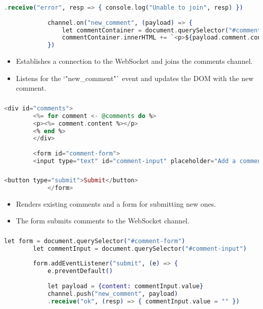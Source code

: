 \documentclass[aspectratio=169, table]{beamer}
\begin{document}
	\begin{frame}[fragile]
		\frametitle{}
		\begin{lstlisting}[language=Elixir]
			.receive("error", resp => { console.log("Unable to join", resp) })
			
			channel.on("new_comment", (payload) => {
				let commentContainer = document.querySelector("#comments")
				commentContainer.innerHTML += `<p>${payload.comment.content}</p>`
			})
		\end{lstlisting}
		\begin{itemize}
			\item Establishes a connection to the WebSocket and joins the comments channel.
			\item Listens for the `"new\_comment"` event and updates the DOM with the new comment.
		\end{itemize}
	\end{frame}
	
	\begin{frame}[fragile]
	\frametitle{}
	\begin{lstlisting}[language=Elixir]
		<div id="comments">
		<%= for comment <- @comments do %>
		<p><%= comment.content %></p>
		<% end %>
		</div>
		
		<form id="comment-form">
		<input type="text" id="comment-input" placeholder="Add a comment..."/>
	\end{lstlisting}
	\end{frame}
	
	\begin{frame}[fragile]
		\frametitle{}
		\begin{lstlisting}[language=Elixir]
			<button type="submit">Submit</button>
			</form>
		\end{lstlisting}
		\begin{itemize}
			\item Renders existing comments and a form for submitting new ones.
			\item The form submits comments to the WebSocket channel.
		\end{itemize}
	\end{frame}
	
	\begin{frame}[fragile]
	\frametitle{}
	\begin{lstlisting}[language=Elixir]
		let form = document.querySelector("#comment-form")
		let commentInput = document.querySelector("#comment-input")
		
		form.addEventListener("submit", (e) => {
			e.preventDefault()
			
			let payload = {content: commentInput.value}
			channel.push("new_comment", payload)
			.receive("ok", (resp) => { commentInput.value = "" })
		\end{lstlisting}
	\end{frame}
	
\end{document}
